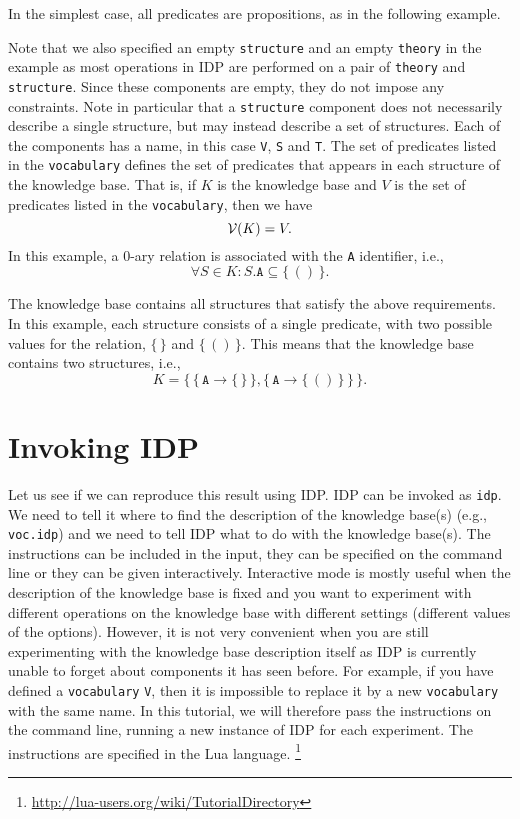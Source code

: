 \documentclass{article}
\newcommand{\idp}{{\sc IDP}\xspace}
\newcommand{\voc}[1]{{\cal V}(#1)}
\begin{document}
In the simplest case, all predicates are propositions, as in the following
example.

Note that we also specified an empty \texttt{structure} and
an empty \texttt{theory}
in the example as most operations in \idp are performed on a pair
of \texttt{theory} and \texttt{structure}.
Since these components are empty, they do not impose any constraints.
Note in particular that a \texttt{structure} component does not
necessarily describe a single structure, but may instead describe
a set of structures.
Each of the components has a name, in this case
\texttt{V}, \texttt{S} and \texttt{T}.
The set of predicates listed in the \texttt{vocabulary} defines
the set of predicates that appears in each structure of the knowledge base.
That is, if $K$ is the knowledge base and $V$ is the set of predicates
listed in the \texttt{vocabulary}, then we have
$$
\voc{K} = V
.
$$
In this example, a $0$-ary relation is
associated with the \texttt{A} identifier, i.e.,
$$
\forall S \in K : S.\mathtt{A} \subseteq \{\, () \,\}
.
$$

The knowledge base contains all structures that satisfy
the above requirements.  In this example, each structure consists
of a single predicate, with two possible values for the relation,
$\{\, \}$ and $\{\, () \,\}$.
This means that the knowledge base contains two structures, i.e.,
$$
K = \{\,
\{\, \mathtt{A} \to \{\, \} \,\},
\{\, \mathtt{A} \to \{\, () \,\} \,\}
\,\}
.
$$

\section{Invoking \idp}

Let us see if we can reproduce this result using \idp.
\idp can be invoked as \texttt{idp}.
We need to tell it where to find the description of the knowledge
base(s) (e.g., \texttt{voc.idp}) and we need to tell \idp what to do with
the knowledge base(s).  The instructions can be included in the input,
they can be specified on the command line or they can be given interactively.
Interactive mode is mostly useful when the description of the knowledge
base is fixed and you want to experiment with different operations
on the knowledge base with different settings (different values of
the options).  However, it is not very convenient when you are still
experimenting with the knowledge base description itself as
\idp is currently unable to forget about components it has seen before.
For example, if you have defined a \texttt{vocabulary} \texttt{V},
then it is impossible to replace it by a new \texttt{vocabulary} with
the same name.
In this tutorial,
we will therefore pass the instructions on the command line,
running a new instance of \idp for each experiment.
The instructions are specified in the Lua language.%
\footnote{\url{http://lua-users.org/wiki/TutorialDirectory}}
\end{document}
